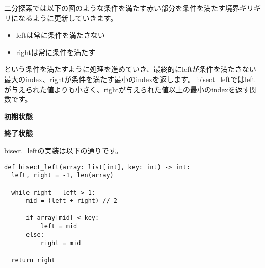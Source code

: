 \documentclass{jlreq}
\begin{document}
二分探索では以下の図のような条件を満たす赤い部分を条件を満たす境界ギリギリになるように更新していきます。

\begin{itemize}
  \item leftは常に条件を満たさない
  \item rightは常に条件を満たす
\end{itemize}

という条件を満たすように処理を進めていき、最終的にleftが条件を満たさない最大のindex、rightが条件を満たす最小のindexを返します。
bisect\_leftではleftが与えられた値よりも小さく、rightが与えられた値以上の最小のindexを返す関数です。

\vspace{0.5cm}

\begin{center}
\end{center}

\begin{center}
  \textbf{初期状態}
\end{center}

\vspace{0.5cm}

\begin{center}
  \end{center}
  
  \begin{center}
    \textbf{終了状態}
  \end{center}

bisect\_leftの実装は以下の通りです。

\begin{lstlisting}[caption=bisect\_leftの実装, frame=TRBL, label={bisect_left}]
def bisect_left(array: list[int], key: int) -> int:
  left, right = -1, len(array)
  
  while right - left > 1:
      mid = (left + right) // 2
      
      if array[mid] < key:
          left = mid
      else:
          right = mid
  
  return right
\end{lstlisting}
\end{document}
